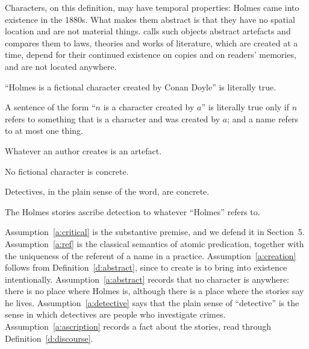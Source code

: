 \documentclass{situationist-preprint}
\begin{document}
Characters, on this definition, may have temporal properties: Holmes came into existence in the 1880s. What makes them abstract is that they have no spatial location and are not material things. \citet{Thomasson1999} calls such objects abstract artefacts and compares them to laws, theories and works of literature, which are created at a time, depend for their continued existence on copies and on readers' memories, and are not located anywhere.

\begin{assumption}\label{a:critical}
\enquote{Holmes is a fictional character created by Conan Doyle} is literally true.
\end{assumption}

\begin{assumption}[Reference]\label{a:ref}
A sentence of the form \enquote{$n$ is a character created by $a$} is literally true only if $n$ refers to something that is a character and was created by $a$; and a name refers to at most one thing.
\end{assumption}

\begin{assumption}[Creation]\label{a:creation}
Whatever an author creates is an artefact.
\end{assumption}

\begin{assumption}[Characters]\label{a:abstract}
No fictional character is concrete.
\end{assumption}

\begin{assumption}[Detectives]\label{a:detective}
Detectives, in the plain sense of the word, are concrete.
\end{assumption}

\begin{assumption}[Ascription]\label{a:ascription}
The Holmes stories ascribe detection to whatever \enquote{Holmes} refers to.
\end{assumption}

Assumption~\ref{a:critical} is the substantive premise, and we defend it in Section~5. Assumption~\ref{a:ref} is the classical semantics of atomic predication, together with the uniqueness of the referent of a name in a practice. Assumption~\ref{a:creation} follows from Definition~\ref{d:abstract}, since to create is to bring into existence intentionally. Assumption~\ref{a:abstract} records that no character is anywhere: there is no place where Holmes is, although there is a place where the stories say he lives. Assumption~\ref{a:detective} says that the plain sense of \enquote{detective} is the sense in which detectives are people who investigate crimes. Assumption~\ref{a:ascription} records a fact about the stories, read through Definition~\ref{d:discourse}.
\end{document}
